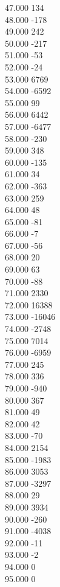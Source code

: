 { 47.000	134 \\
 48.000	-178 \\
 49.000	242 \\
 50.000	-217 \\
 51.000	-53 \\
 52.000	-24 \\
 53.000	6769 \\
 54.000	-6592 \\
 55.000	99 \\
 56.000	6442 \\
 57.000	-6477 \\
 58.000	-230 \\
 59.000	348 \\
 60.000	-135 \\
 61.000	34 \\
 62.000	-363 \\
 63.000	259 \\
 64.000	48 \\
 65.000	-81 \\
 66.000	-7 \\
 67.000	-56 \\
 68.000	20 \\
 69.000	63 \\
 70.000	-88 \\
 71.000	2330 \\
 72.000	16388 \\
 73.000	-16046 \\
 74.000	-2748 \\
 75.000	7014 \\
 76.000	-6959 \\
 77.000	245 \\
 78.000	336 \\
 79.000	-940 \\
 80.000	367 \\
 81.000	49 \\
 82.000	42 \\
 83.000	-70 \\
 84.000	2154 \\
 85.000	-1983 \\
 86.000	3053 \\
 87.000	-3297 \\
 88.000	29 \\
 89.000	3934 \\
 90.000	-260 \\
 91.000	-4038 \\
 92.000	-11 \\
 93.000	-2 \\
 94.000	0 \\
 95.000	0 \\
}
